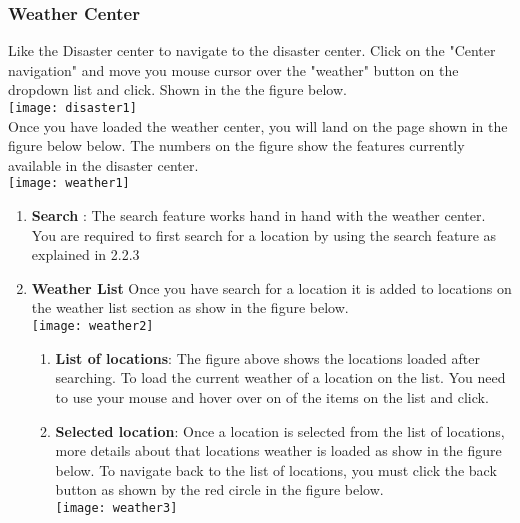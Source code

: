 \subsubsection{Weather Center}
Like the Disaster center to navigate to the disaster center. Click on the "Center navigation" and move you mouse cursor over the "weather" button on the dropdown list and click. Shown in the the figure below. \\[0.5cm]
\texttt{[image: disaster1]} \\[0.5cm]
Once you have loaded the weather center, you will land on the page shown in the figure below below. The numbers on the figure show the features currently available in the disaster center. \\[0.5cm]
\texttt{[image: weather1]} \\[0.5cm]
	\begin{enumerate}
		\item \textbf{Search} : The search feature works hand in hand with the weather center. You are required to first search for a location by using the search feature as explained in 2.2.3
		\item \textbf{Weather List}
		Once you have search for a location it is added to locations on the weather list section as show in the figure below. \\[0.5cm]
		\texttt{[image: weather2]} \\[0.5cm]
		\begin{enumerate}
		\item \textbf{List of locations}: The figure above shows the locations loaded after searching. To load the current weather of a location on the list. You need to use your mouse and hover over on of the items on the list and click. 
		\item \textbf{Selected location}: Once a location is selected from the list of locations, more details about that locations weather is loaded as show in the figure below. To navigate back to the list of locations, you must click the back button as shown by the red circle in the figure below. \\[0.2cm]
		\texttt{[image: weather3]} \\[0.5cm]
		\end{enumerate}
	\end{enumerate}
